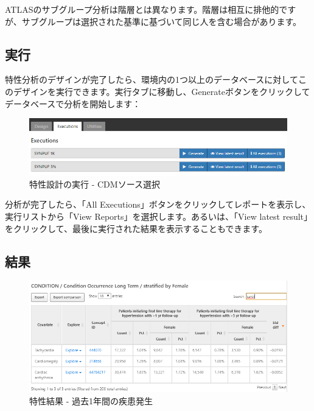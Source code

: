 \documentclass[
  11pt]{book}
\makeatletter
\newenvironment{kframe}{%
\medskip{}
\setlength{\fboxsep}{.8em}
 \def\at@end@of@kframe{}%
 \ifinner\ifhmode%
  \def\at@end@of@kframe{\end{minipage}}%
  \begin{minipage}{\columnwidth}%
 \fi\fi%
 \def\FrameCommand##1{\hskip\@totalleftmargin \hskip-\fboxsep
 \colorbox{myShadeColor}{##1}\hskip-\fboxsep
     \hskip-\linewidth \hskip-\@totalleftmargin \hskip\columnwidth}%
 \MakeFramed {\advance\hsize-\width
   \@totalleftmargin\z@ \linewidth\hsize
   \@setminipage}}%
 {\par\unskip\endMakeFramed%
 \at@end@of@kframe}
\newenvironment{rmdblock}[1]
  {
  \begin{itemize}
  \renewcommand{\labelitemi}{
    \raisebox{-.7\height}[0pt][0pt]{
      {\setkeys{Gin}{width=3em,keepaspectratio}\texttt{[image: images/\#1]}}
    }
  }
  \setlength{\fboxsep}{1em}
  \begin{kframe}
  \item
  }
  {
  \end{kframe}
  \end{itemize}
  }
\newenvironment{rmdimportant}
  {\begin{rmdblock}{important}}
  {\end{rmdblock}}
\theoremstyle{definition}
\theoremstyle{definition}
\theoremstyle{definition}
\theoremstyle{definition}
\theoremstyle{remark}
\makeatother
\begin{document}
\begin{rmdimportant}
ATLASのサブグループ分析は階層とは異なります。階層は相互に排他的ですが、サブグループは選択された基準に基づいて同じ人を含む場合があります。
\end{rmdimportant}

\subsection{実行}\label{ux5b9fux884c}

特性分析のデザインが完了したら、環境内の1つ以上のデータベースに対してこのデザインを実行できます。実行タブに移動し、Generateボタンをクリックしてデータベースで分析を開始します：

\begin{figure}

{\centering \includegraphics[width=1\linewidth]{images/Characterization/atlasCharacterizationExecutions} 

}

\caption{特性設計の実行 - CDMソース選択}\label{fig:atlasCharacterizationExecutions}
\end{figure}

分析が完了したら、「All Executions」ボタンをクリックしてレポートを表示し、実行リストから「View Reports」を選択します。あるいは、「View latest result」をクリックして、最後に実行された結果を表示することもできます。

\subsection{結果}\label{ux7d50ux679c-1}

\begin{figure}

{\centering \includegraphics[width=1\linewidth]{images/Characterization/atlasCharacterizationResultsSummary} 

}

\caption{特性結果 - 過去1年間の疾患発生}\label{fig:atlasCharacterizationResultsSummary}
\end{figure}
\end{document}
